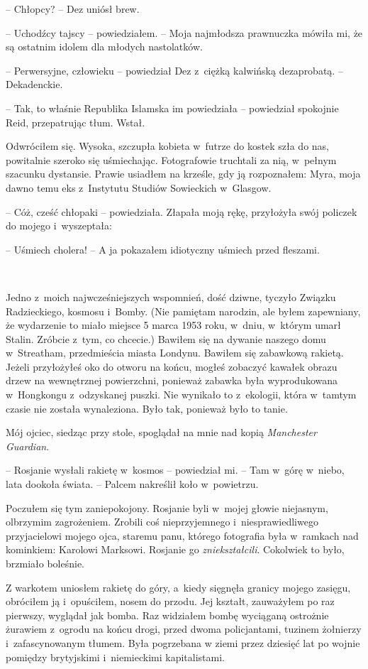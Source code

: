 \documentclass[oneside,polish,11pt,sfheadings]{mwbk}
\begin{document}
-- Chłopcy? -- Dez uniósł brew.

-- Uchodźcy tajscy -- powiedziałem. -- Moja najmłodsza prawnuczka mówiła
mi, że są ostatnim idolem dla młodych nastolatków.

-- Perwersyjne, człowieku -- powiedział Dez z~ciężką kalwińską
dezaprobatą. -- Dekadenckie.

-- Tak, to właśnie Republika Islamska im powiedziała -- powiedział
spokojnie Reid, przepatrując tłum. Wstał.

Odwróciłem się. Wysoka, szczupła kobieta w~futrze do kostek szła do nas,
powitalnie szeroko się uśmiechając. Fotografowie truchtali za nią, w~pełnym szacunku dystansie. Prawie usiadłem na krześle, gdy ją
rozpoznałem: Myra, moja dawno temu eks z~Instytutu Studiów Sowieckich w~Glasgow.

-- Cóż, cześć chłopaki -- powiedziała. Złapała moją rękę, przyłożyła swój
policzek do mojego i~wyszeptała: 

-- Uśmiech cholera! -- A ja pokazałem idiotyczny uśmiech przed fleszami.

~

Jedno z~moich najwcześniejszych wspomnień, dość dziwne, tyczyło Związku
Radzieckiego, kosmosu i~Bomby. (Nie pamiętam narodzin, ale byłem
zapewniany, że wydarzenie to miało miejsce 5 marca 1953 roku, w~dniu, w~którym umarł Stalin. Zróbcie z~tym, co chcecie.) Bawiłem się na dywanie
naszego domu w~Streatham, przedmieścia miasta Londynu. Bawiłem się
zabawkową rakietą. Jeżeli przyłożyłeś oko do otworu na końcu, mogłeś
zobaczyć kawałek obrazu drzew na wewnętrznej powierzchni, ponieważ
zabawka była wyprodukowana w~Hongkongu z~odzyskanej puszki. Nie wynikało
to z~ekologii, która w~tamtym czasie nie została wynaleziona. Było tak,
ponieważ było to tanie.

Mój ojciec, siedząc przy stole, spoglądał na mnie nad kopią
\emph{Manchester Guardian}.

-- Rosjanie wysłali rakietę w~kosmos -- powiedział mi. -- Tam w~górę w~niebo, lata dookoła świata. -- Palcem nakreślił koło w~powietrzu.

Poczułem się tym zaniepokojony. Rosjanie byli w~mojej głowie niejasnym,
olbrzymim zagrożeniem. Zrobili coś nieprzyjemnego i~niesprawiedliwego
przyjacielowi mojego ojca, staremu panu, którego fotografia była w~ramkach nad kominkiem: Karolowi Marksowi. Rosjanie go
\emph{zniekształcili}. Cokolwiek to było, brzmiało boleśnie.

Z warkotem uniosłem rakietę do góry, a~kiedy sięgnęła granicy mojego
zasięgu, obróciłem ją i~opuściłem, nosem do przodu. Jej kształt,
zauważyłem po raz pierwszy, wyglądał jak bomba. Raz widziałem bombę
wyciąganą ostrożnie żurawiem z~ogrodu na końcu drogi, przed dwoma
policjantami, tuzinem żołnierzy i~zafascynowanym tłumem. Była pogrzebana
w ziemi przez dziesięć lat po wojnie pomiędzy brytyjskimi i~niemieckimi
kapitalistami.
\end{document}
